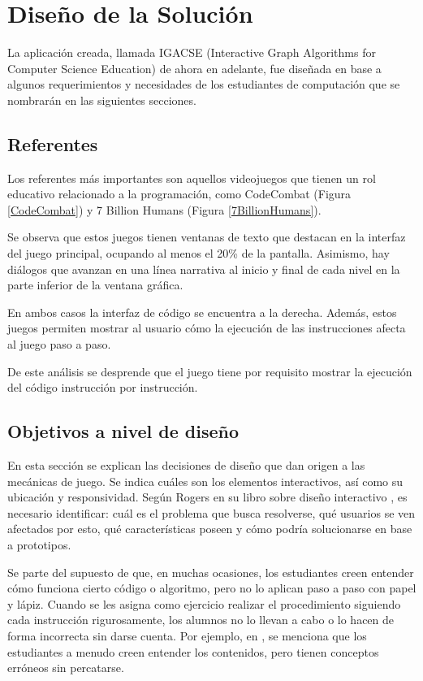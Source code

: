 \chapter{Diseño de la Solución}

La aplicación creada, llamada IGACSE (Interactive Graph Algorithms for Computer Science Education) de ahora en adelante, fue diseñada en base a algunos requerimientos y necesidades de los estudiantes de computación que se nombrarán en las siguientes secciones.

\section{Referentes}

Los referentes más importantes son aquellos videojuegos que tienen un rol educativo relacionado a la programación, como CodeCombat (Figura \ref{CodeCombat}) y 7 Billion Humans (Figura \ref{7BillionHumans}).

Se observa que estos juegos tienen ventanas de texto que destacan en la interfaz del juego principal, ocupando al menos el 20\% de la pantalla. Asimismo, hay diálogos que avanzan en una línea narrativa al inicio y final de cada nivel en la parte inferior de la ventana gráfica.

En ambos casos la interfaz de código se encuentra a la derecha. Además, estos juegos permiten mostrar al usuario cómo la ejecución de las instrucciones afecta al juego paso a paso.

De este análisis se desprende que el juego tiene por requisito mostrar la ejecución del código instrucción por instrucción.

\section{Objetivos a nivel de diseño}

En esta sección se explican las decisiones de diseño que dan origen a las mecánicas de juego. Se indica cuáles son los elementos interactivos, así como su ubicación y responsividad. Según Rogers en su libro sobre diseño interactivo \cite{Rogers2002InteractionDesign}, es necesario identificar: cuál es el problema que busca resolverse, qué usuarios se ven afectados por esto, qué características poseen y cómo podría solucionarse en base a prototipos.

Se parte del supuesto de que, en muchas ocasiones, los estudiantes creen entender cómo funciona cierto código o algoritmo, pero no lo aplican paso a paso con papel y lápiz. Cuando se les asigna como ejercicio realizar el procedimiento siguiendo cada instrucción rigurosamente, los alumnos no lo llevan a cabo o lo hacen de forma incorrecta sin darse cuenta. Por ejemplo, en \cite{IdentifyingStudentDifficultiesDataStructures}, se menciona que los estudiantes a menudo creen entender los contenidos, pero tienen conceptos erróneos sin percatarse.


